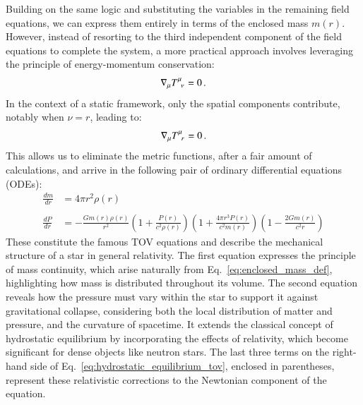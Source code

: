 \documentclass[main.tex]{subfiles}
\begin{document}
     Building on the same logic and substituting the variables in the remaining field equations, we can express them entirely in terms of the enclosed mass $m(r)$. However, instead of resorting to the third independent component of the field equations to complete the system, a more practical approach involves leveraging the principle of energy-momentum conservation:
     \begin{equation}
        \nabla_\mu T\indices{^\mu_\nu} = 0\,.
     \end{equation}
     In the context of a static framework, only the spatial components contribute, notably when $\nu = r$, leading to:
     \begin{equation}
         \nabla_\mu T\indices{^\mu_r} = 0\,.
     \end{equation}
     This allows us to eliminate the metric functions, after a fair amount of calculations, and arrive in the following pair of ordinary differential equations (ODEs):
     \begin{align}
         \frac{dm}{dr} &= 4\pi r^2 \rho(r) \label{eq:mass_continuity_tov} \\\nonumber\\ 
         \frac{dP}{dr} &= - \frac{Gm(r)\rho(r)}{r^2}\left(1 + \frac{P(r)}{c^2\rho(r)}\right)\left(1 + \frac{4\pi r^3 P(r)}{c^2 m(r)}\right)\left(1 - \frac{2Gm(r)}{c^2r}\right) 
         \label{eq:hydrostatic_equilibrium_tov}
     \end{align}
     These constitute the famous TOV equations and describe the mechanical structure of a star in general relativity. The first equation expresses the principle of mass continuity, which arise naturally from Eq.~\eqref{eq:enclosed_mass_def}, highlighting how mass is distributed throughout its volume.
     The second equation reveals how the pressure must vary within the star to support it against gravitational collapse, considering both the local distribution of matter and pressure, and the curvature of spacetime. It extends the classical concept of hydrostatic equilibrium by incorporating the effects of relativity, which become significant for dense objects like neutron stars. The last three terms on the right-hand side of Eq.~\eqref{eq:hydrostatic_equilibrium_tov}, enclosed in parentheses, represent these relativistic corrections to the Newtonian component of the equation. 
\end{document}
